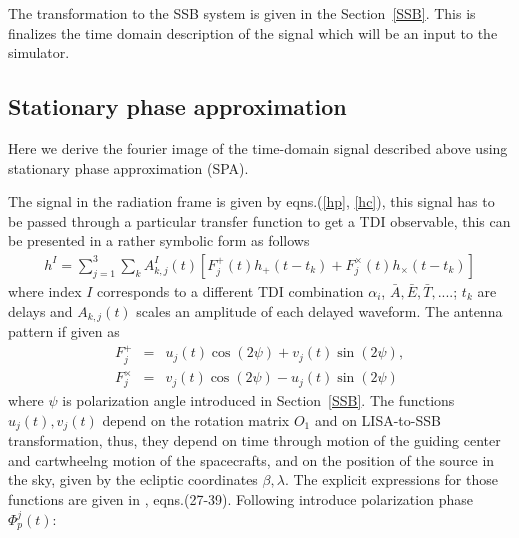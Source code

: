 \documentclass[11pt]{report}
\def\bea{\begin{eqnarray}}
\def\ena{\end{eqnarray}}
\begin{document}
The transformation to the SSB system is given in the Section~\ref{SSB}. This is finalizes the time domain description of the 
signal which will be an input to the simulator. 

\subsection{Stationary phase approximation}

Here we derive the fourier image of the time-domain signal 
described above using stationary phase approximation (SPA).

The signal in the radiation frame is given by eqns.(\ref{hp},
\ref{hc}), this signal has to be passed through a particular 
transfer function to get a TDI observable, this can be presented in a rather symbolic form as follows
\bea
h^{I} = \sum_{j=1}^{3}\sum_k A_{k,j}^{I}(t)\left[ 
F^{+}_j(t)h_{+}(t-t_k) + F^{\times}_{j}(t)h_{\times}(t-t_k)
\right]
\ena
where index $I$ corresponds to a different TDI combination $\alpha_i$,
$\bar{A}, \bar{E}, \bar{T},....$; $t_k$ are delays and $A_{k,j}(t)$
 scales an amplitude of each delayed waveform. The antenna pattern 
if given as 
\bea
F_j^{+} &=& u_j(t)\cos(2\psi) + v_j(t)\sin(2\psi),\\
F_j^{\times} &=& v_j(t)\cos(2\psi) - u_j(t)\sin(2\psi)
\ena
where $\psi$ is polarization angle introduced in Section~\ref{SSB}. 
The functions $u_j(t), v_j(t)$ depend on the rotation matrix $O_1$
and on LISA-to-SSB transformation, thus, they depend on time through  motion of the guiding center and cartwheelng motion of the spacecrafts, and on the position of the source in the sky,
given by the ecliptic coordinates $\beta,\lambda$. The explicit 
expressions for those functions are given in \cite{KTV}, eqns.(27-39). 
Following \cite{Cutler} introduce polarization phase $\Phi_p^j(t)$:
\end{document}
